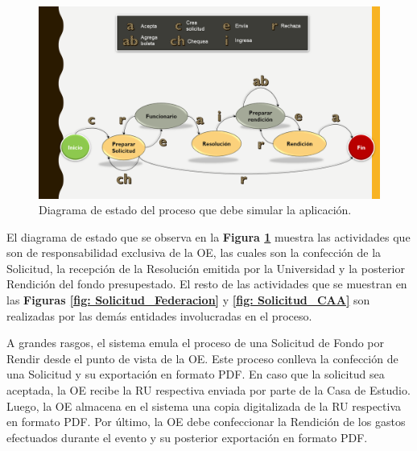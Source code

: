 \begin{figure}[h!tb]
    \hspace{-9mm}
    \includegraphics[width=1.1\textwidth]{Imagenes/Diagrama_de_estado.png}
    \caption{\label{fig: diagrama_estado}Diagrama de estado del proceso que debe simular la aplicación.}
\end{figure}

El diagrama de estado que se observa en la \textbf{Figura \ref{fig: diagrama_estado}} muestra las actividades que son de responsabilidad exclusiva de la OE, las cuales son la confección de la Solicitud, la recepción de la Resolución emitida por la Universidad y la posterior Rendición del fondo presupestado. El resto de las actividades que se muestran en las \textbf{Figuras \ref{fig: Solicitud_Federacion}} y \textbf{\ref{fig: Solicitud_CAA}} son realizadas por las demás entidades involucradas en el proceso.

A grandes rasgos, el sistema emula el proceso de una Solicitud de Fondo por Rendir desde el punto de vista de la OE. Este proceso conlleva la confección de una Solicitud y su exportación en formato PDF. En caso que la solicitud sea aceptada, la OE recibe la RU respectiva enviada por parte de la Casa de Estudio. Luego, la OE almacena en el sistema una copia digitalizada de la RU respectiva en formato PDF. Por último, la OE debe confeccionar la Rendición de los gastos efectuados durante el evento y su posterior exportación en formato PDF.